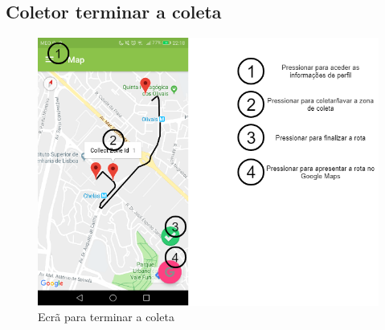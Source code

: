 \documentclass[10pt,a5paper]{article}
\begin{document}
\newpage
\subsection{Coletor terminar a coleta} 

\begin{figure}[!h]
	\centering
	\includegraphics[width=1.1\textwidth]{Images/screens/collector_finish}
	\caption{Ecrã para terminar a coleta}
	\label{fig:collector_finish}
\end{figure}
\end{document}
